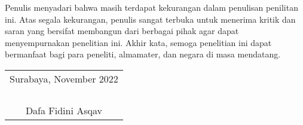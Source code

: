 Penulis menyadari bahwa masih terdapat kekurangan dalam penulisan penilitan ini. Atas segala kekurangan, penulis sangat
terbuka untuk menerima kritik dan saran yang bersifat membangun dari berbagai pihak agar dapat menyempurnakan penelitian ini. 
Akhir kata, semoga penelitian ini dapat bermanfaat bagi para peneliti, almamater, dan negara di masa mendatang.

\begin{flushright}
  \begin{tabular}[b]{c}
    Surabaya, November 2022\\
    \\
    \\
    \\
    \\
    Dafa Fidini Asqav
  \end{tabular}
\end{flushright}
